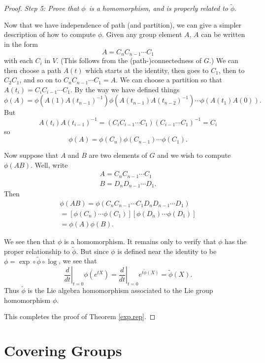 \documentclass[12pt]{amsbook}
\theoremstyle{plain}
\numberwithin{equation}{chapter}
\numberwithin{theorem}{chapter}
\begin{document}
\begin{proof}
\textit{Step 5: Prove that }$\phi$\textit{\ is a homomorphism, and is properly
related to }$\widetilde{\phi}$.

Now that we have independence of path (and partition), we can give a simpler
description of how to compute $\phi$. Given any group element $A$, $A$ can be
written in the form
\[
A=C_{n}C_{n-1}\cdots C_{1}%
\]
with each $C_{i}$ in $V$. (This follows from the (path-)connectedness of $G$.)
We can then choose a path $A(t)$ which starts at the identity, then goes to
$C_{1}$, then to $C_{2}C_{1}$, and so on to $C_{n}C_{n-1}\cdots C_{1}=A$. We
can choose a partition so that $A(t_{i})=C_{i}C_{i-1}\cdots C_{1}$. By the way
we have defined things
\[
\phi(A)=\phi\left(  A(1)A(t_{n-1})^{-1}\right)  \phi\left(  A(t_{n-1}%
)A(t_{n-2})^{-1}\right)  \cdots\phi\left(  A(t_{1})A(0)\right)  \text{.}%
\]
But
\[
A(t_{i})A(t_{i-1})^{-1}=\left(  C_{i}C_{i-1}\cdots C_{1}\right)  \left(
C_{i-1}\cdots C_{1}\right)  ^{-1}=C_{i}%
\]
so
\[
\phi(A)=\phi(C_{n})\phi(C_{n-1})\cdots\phi(C_{1})\text{.}%
\]

Now suppose that $A$ and $B$ are two elements of $G$ and we wish to compute
$\phi(AB)$. Well, write
\begin{align*}
A=C_{n}C_{n-1}\cdots C_{1}\\
B=D_{n}D_{n-1}\cdots D_{1}\text{.}%
\end{align*}
Then
\begin{align*}
\phi\left(  AB\right)  =\phi\left(  C_{n}C_{n-1}\cdots C_{1}D_{n}D_{n-1}\cdots
D_{1}\right)  \\
=\left[  \phi(C_{n})\cdots\phi(C_{1})\right]  \left[  \phi(D_{n})\cdots
\phi(D_{1})\right]  \\
=\phi(A)\phi(B)\text{.}%
\end{align*}

We see then that $\phi$ is a homomorphism. It remains only to verify that
$\phi$ has the proper relationship to $\widetilde{\phi}$. But since $\phi$ is
defined near the identity to be $\phi=\exp\circ\widetilde{\phi}\circ\log$, we
see that
\[
\left.  \frac{d}{dt}\right|  _{t=0}\phi\left(  e^{tX}\right)  =\left.
\frac{d}{dt}\right|  _{t=0}e^{t\widetilde{\phi}(X)}=\widetilde{\phi
}(X)\text{.}%
\]
Thus $\widetilde{\phi}$ is the Lie algebra homomorphism associated to the Lie
group homomorphism $\phi$.

This completes the proof of Theorem \ref{exp.rep}.
\end{proof}

\section{Covering Groups}
\end{document}
